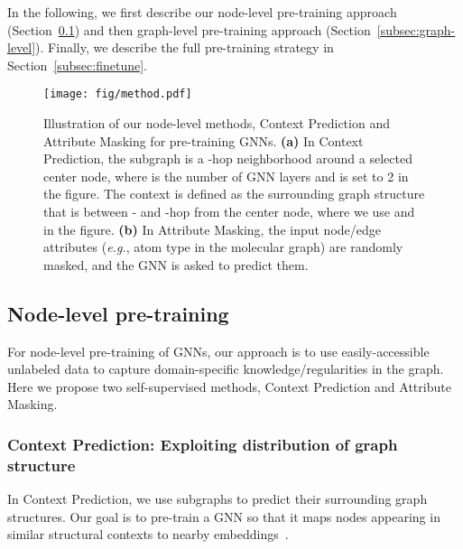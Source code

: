 \documentclass{article} \usepackage{iclr2020_conference,times}
\numberwithin{equation}{section}
\theoremstyle{plain}
\theoremstyle{definition}
\theoremstyle{remark}
\newcommand{\hide}[1]{}
\newcommand{\ie}{\textit{i.e.}}
\newcommand{\eg}{\textit{e.g.}}
\begin{document}
\hide{
Given that GNNs  obtain the representation of the entire graphs by first computing individual node representations, we propose to pre-train GNNs at the level of \emph{both} individual nodes and the entire graphs. This encourages GNNs to capture domain-specific semantics at the both scales, as illustrated in Figure~\ref{fig:principle} (a.iii).
This is in contrast to the conventional pre-training approaches, \ie, either only performing supervised pre-training to predict auxiliary properties of entire graphs \citep{ramsundar2015massively, ramsundar2017multitask, xu2017demystifying, kearnes2016modeling}, as illustrated in Figure~\ref{fig:principle} (a.ii), or only applying a node representation learning technique \citep{jaeger2018mol2vec}, as illustrated in Figure~\ref{fig:principle} (a.i).
}

In the following, we first describe our node-level pre-training approach (Section~\ref{subsec:nodelevel}) and then graph-level pre-training approach (Section~\ref{subsec:graph-level}). 
Finally, we describe the full pre-training strategy in Section~\ref{subsec:finetune}.

\begin{figure}[t]
\texttt{[image: fig/method.pdf]}
\caption{Illustration of our node-level methods, Context Prediction and Attribute Masking for pre-training GNNs. {\bf (a)} In Context Prediction, the subgraph is a -hop neighborhood around a selected center node, where  is the number of GNN layers and is set to 2 in the figure. The context is defined as the surrounding graph structure that is between - and -hop from the center node, where we use  and  in the figure. {\bf (b)} In Attribute Masking, the input node/edge attributes (\eg, atom type in the molecular graph) are randomly masked, and the GNN is asked to predict them.}
\label{fig:method}
\end{figure}

\subsection{Node-level pre-training} \label{subsec:nodelevel}

For node-level pre-training of GNNs, our approach is to use easily-accessible unlabeled data to capture domain-specific knowledge/regularities in the graph. Here we propose two self-supervised methods, Context Prediction and Attribute Masking. 



\subsubsection{Context Prediction: Exploiting distribution of graph structure} \label{sec:context_pred}
In Context Prediction, we use subgraphs to predict their surrounding graph structures.
Our goal is to pre-train a GNN so that it maps nodes appearing in similar structural contexts to nearby embeddings~\citep{rubenstein1965contextual,mikolov2013distributed}.
\end{document}
